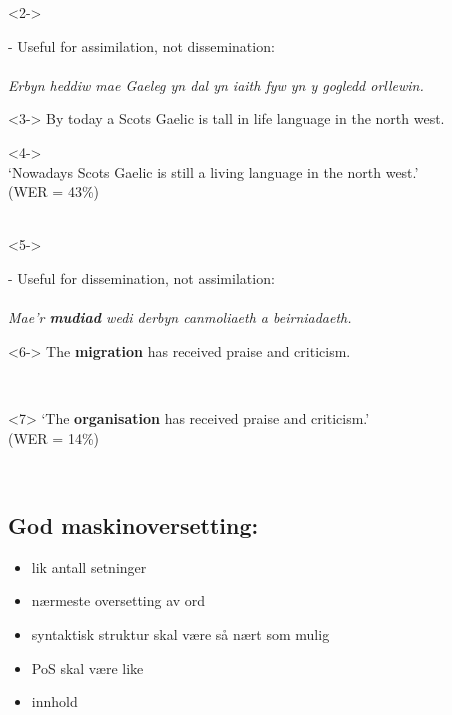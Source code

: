 \documentclass[a4paper,english,12pt]{article}
\begin{document}
\begin{spacing}{1.0}
\begin{onlyenv}
\end{onlyenv}

\begin{onlyenv}<2->

- Useful for assimilation, not dissemination:\\
~\\
\emph{Erbyn heddiw mae Gaeleg yn dal yn iaith fyw yn y gogledd orllewin. }\\
\end{onlyenv}

\begin{onlyenv}<3->
By today a Scots Gaelic is tall in life language in the north west.\\
\end{onlyenv}

\begin{onlyenv}<4->
~\\
`Nowadays Scots Gaelic is still a living language in the north west.'\\ (WER = 43\%)\\
~\\
\end{onlyenv}

\begin{onlyenv}<5->

- Useful for dissemination, not assimilation:\\
~\\
\emph{Mae'r \textbf<7>{mudiad} wedi derbyn canmoliaeth a beirniadaeth.}\\
\end{onlyenv}

\begin{onlyenv}<6->
The \textbf<7>{migration} has received praise and criticism.\\
\end{onlyenv}

~\\
\begin{onlyenv}<7>
`The \textbf<7>{organisation} has received praise and criticism.'\\ (WER = 14\%)\\
\end{onlyenv}

~\\

 

\subsection{God maskinoversetting:}
\begin{itemize}
  \item lik antall setninger
  \item nærmeste oversetting av ord
  \item syntaktisk struktur skal være så nært som mulig
  \item PoS skal være like
  \item innhold
\end{itemize}
 



\end{spacing}
\end{document}

